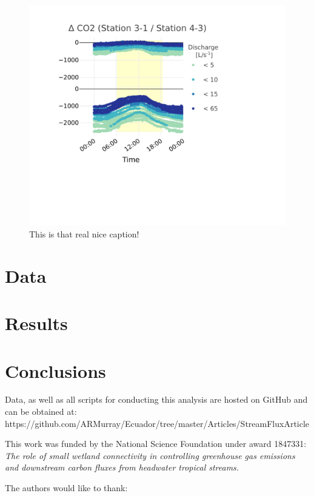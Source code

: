 \documentclass[draft,linenumbers]{agujournal2018}
\begin{document}
\begin{figure}[h]
\includegraphics{StreamFluxArticle_files/figure-latex/filt14PpmPlot-1} \caption{This is that real nice caption!}\label{fig:filt14PpmPlot}
\end{figure}

\section{Data}

\section{Results}

\section{Conclusions}

\acknowledgments

Data, as well as all scripts for conducting this analysis are hosted on
GitHub and can be obtained at:
https://github.com/ARMurray/Ecuador/tree/master/Articles/StreamFluxArticle

This work was funded by the National Science Foundation under award
1847331: \emph{The role of small wetland connectivity in controlling
greenhouse gas emissions and downstream carbon fluxes from headwater
tropical streams.}

The authors would like to thank:
\end{document}

